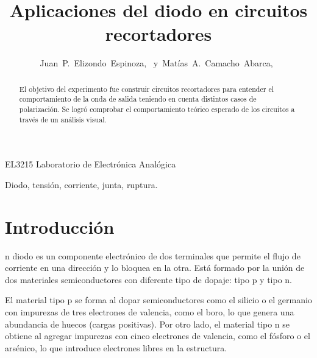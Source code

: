 \documentclass[journal]{IEEEtran}
\begin{document}
%
\title{Aplicaciones del diodo en circuitos recortadores}


\author{Juan~P.~Elizondo~Espinoza,~
        y~Matías~A.~Camacho~Abarca,~
}


%
{EL3215 Laboratorio de Electrónica Analógica}


\maketitle


\begin{abstract}
El objetivo del experimento fue construir circuitos recortadores para entender el comportamiento de la onda de salida
teniendo en cuenta distintos casos de polarización. Se logró comprobar el comportamiento teórico esperado de los circuitos a través de un análisis visual.
\end{abstract}

\begin{IEEEkeywords}
Diodo, tensión, corriente, junta, ruptura.
\end{IEEEkeywords}


\section{Introducción}

n diodo es un componente electrónico de dos terminales que permite el flujo de corriente en una dirección y lo bloquea en la otra. Está formado por la unión de dos materiales semiconductores con diferente tipo de dopaje: tipo p y tipo n.

El material tipo p se forma al dopar semiconductores como el silicio o el germanio con impurezas de tres electrones de valencia, como el boro, lo que genera una abundancia de huecos (cargas positivas). Por otro lado, el material tipo n se obtiene al agregar impurezas con cinco electrones de valencia, como el fósforo o el arsénico, lo que introduce electrones libres en la estructura.
\end{document}
